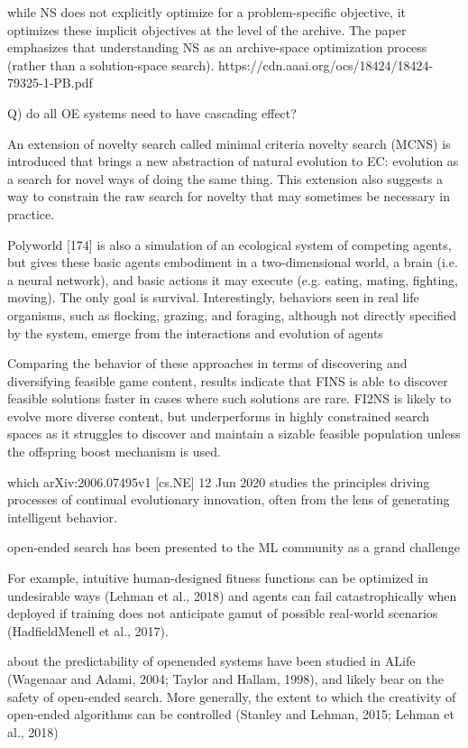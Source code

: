 while NS does not explicitly optimize for a problem-specific objective, it optimizes these implicit objectives at the level of the archive. The paper emphasizes that understanding NS as an archive-space optimization process (rather than a solution-space search). https://cdn.aaai.org/ocs/18424/18424-79325-1-PB.pdf

Q) do all OE systems need to have cascading effect? 

An extension of novelty search called minimal criteria novelty search (MCNS) is introduced that brings a new abstraction of natural evolution to EC: evolution as a search
for novel ways of doing the same thing. This extension also suggests a way to constrain
the raw search for novelty that may sometimes be necessary in practice.

Polyworld [174] is also a simulation of an ecological system of competing agents, but gives
these basic agents embodiment in a two-dimensional world, a brain (i.e. a neural network),
and basic actions it may execute (e.g. eating, mating, fighting, moving). The only goal is
survival. Interestingly, behaviors seen in real life organisms, such as flocking, grazing, and
foraging, although not directly specified by the system, emerge from the interactions and
evolution of agents

Comparing the behavior of these approaches in terms of discovering and diversifying feasible game content, results indicate that FINS is able to discover feasible solutions faster in cases where such solutions are rare. FI2NS is likely to evolve more diverse content, but underperforms in highly constrained search spaces as it struggles to discover and maintain a sizable feasible population unless the offspring boost mechanism is used.

which arXiv:2006.07495v1 [cs.NE] 12 Jun 2020 studies the principles driving processes of continual evolutionary innovation, often from the lens of generating intelligent behavior.

open-ended search has been presented to the ML community as a grand challenge

For example, intuitive human-designed fitness functions can be optimized
in undesirable ways (Lehman et al., 2018) and agents can
fail catastrophically when deployed if training does not anticipate gamut of possible real-world scenarios (HadfieldMenell et al., 2017). 

about the predictability of openended systems have been studied in ALife (Wagenaar and
Adami, 2004; Taylor and Hallam, 1998), and likely bear on
the safety of open-ended search. More generally, the extent to which the creativity of open-ended algorithms can be
controlled (Stanley and Lehman, 2015; Lehman et al., 2018)

